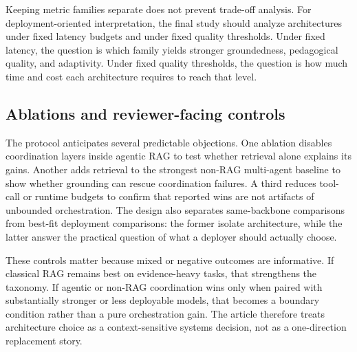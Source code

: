 Keeping metric families separate does not prevent trade-off analysis. For deployment-oriented interpretation, the final study should analyze architectures under fixed latency budgets and under fixed quality thresholds. Under fixed latency, the question is which family yields stronger groundedness, pedagogical quality, and adaptivity. Under fixed quality thresholds, the question is how much time and cost each architecture requires to reach that level.

\subsection{Ablations and reviewer-facing controls}

The protocol anticipates several predictable objections. One ablation disables coordination layers inside agentic RAG to test whether retrieval alone explains its gains. Another adds retrieval to the strongest non-RAG multi-agent baseline to show whether grounding can rescue coordination failures. A third reduces tool-call or runtime budgets to confirm that reported wins are not artifacts of unbounded orchestration. The design also separates same-backbone comparisons from best-fit deployment comparisons: the former isolate architecture, while the latter answer the practical question of what a deployer should actually choose.

These controls matter because mixed or negative outcomes are informative. If classical RAG remains best on evidence-heavy tasks, that strengthens the taxonomy. If agentic or non-RAG coordination wins only when paired with substantially stronger or less deployable models, that becomes a boundary condition rather than a pure orchestration gain. The article therefore treats architecture choice as a context-sensitive systems decision, not as a one-direction replacement story.
